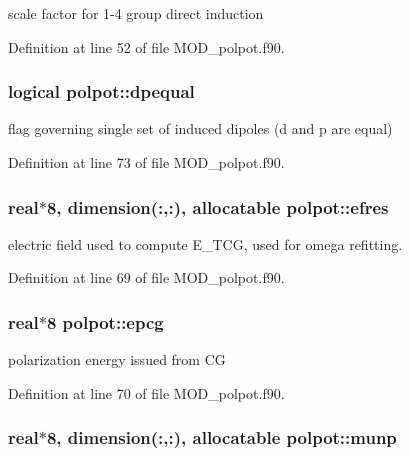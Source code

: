 scale factor for 1-\/4 group direct induction 



Definition at line 52 of file M\-O\-D\-\_\-polpot.\-f90.

\hypertarget{classpolpot_a1798b6de41bb676fcde778df28be9810}{
\subsubsection[{dpequal}]{\setlength{\rightskip}{0pt plus 5cm}logical polpot\-::dpequal}}\label{classpolpot_a1798b6de41bb676fcde778df28be9810}


flag governing single set of induced dipoles (d and p are equal) 



Definition at line 73 of file M\-O\-D\-\_\-polpot.\-f90.

\hypertarget{classpolpot_a6f222d16444d165478dfb371302763a4}{
\subsubsection[{efres}]{\setlength{\rightskip}{0pt plus 5cm}real$\ast$8, dimension(\-:,\-:), allocatable polpot\-::efres}}\label{classpolpot_a6f222d16444d165478dfb371302763a4}


electric field used to compute E\-\_\-\-T\-C\-G, used for omega refitting. 



Definition at line 69 of file M\-O\-D\-\_\-polpot.\-f90.

\hypertarget{classpolpot_a0038c68de694ddc7dbb7dc781aa2c845}{
\subsubsection[{epcg}]{\setlength{\rightskip}{0pt plus 5cm}real$\ast$8 polpot\-::epcg}}\label{classpolpot_a0038c68de694ddc7dbb7dc781aa2c845}


polarization energy issued from C\-G 



Definition at line 70 of file M\-O\-D\-\_\-polpot.\-f90.

\hypertarget{classpolpot_a0d42cffaacfef58c15d8404101cf8112}{
\subsubsection[{munp}]{\setlength{\rightskip}{0pt plus 5cm}real$\ast$8, dimension(\-:,\-:), allocatable polpot\-::munp}}\label{classpolpot_a0d42cffaacfef58c15d8404101cf8112}


